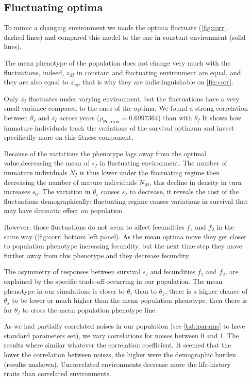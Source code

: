\subsection*{Fluctuating optima}

To mimic a changing environment we made the optima fluctuate (\autoref{fig:corr}, dashed lines) and compared this model to the one in constant environment (solid lines).

The mean phenotype of the population does not change very much with the fluctuations, indeed, $\overline{z_M}$ in constant and fluctuating environment are equal, and they are also equal to $\overline{z_{eq}}$, that is why they are indistinguishable on \autoref{fig:corr}.

Only $\overline{z_I}$ fluctuates under varying environment, but the fluctuations have a very small variance compared to the ones of the optima. We found a strong correlation between $\theta_s$ and $\overline{z_I}$ across years ($\rho_{\text{Pearson}} = 0.6997364$) than with $\theta_f$ It shows how immature individuals track the variations of the survival optimum and invest specifically more on this fitness component.

Because of the variations the phenotype lags away from the optimal value,decreasing the mean of $s_I$ in fluctuating environment. The number of immature individuals $N_I$ is thus lower under the fluctuating regime then decreasing the number of mature individuals $N_M$, this decline in density in turn increases $s_0$. The variation in $\theta_s$ causes $s_I$ to decrease, it reveals the cost of the fluctuations demographically: fluctuating regime causes variations in survival that may have dramatic effect on population.

However, those fluctuations do not seem to affect fecundities $f_1$ and $f_2$ in the same way (\autoref{fig:corr} bottom left panel). As the mean optima move they get closer to population phenotype increasing fecundity, but the next time step they move further away from this phenotype and they decrease fecundity.

The asymmetry of responses between  survival $s_I$ and  fecundities $f_1$ and $f_2$, are explained by the specific trade-off occurring in our population. The mean phenotype in our simulations is closer to $\theta_s$ than to $\theta_f$, there is a higher chance of $\theta_s$ to be lower or much higher than the mean population phenotype, then there is for $\theta_f$ to cross the mean population phenotype line.

As we had partially correlated noises in our population (see \autoref{tab:params} to have standard parameters set), we vary correlations for noises between 0 and 1. The results where similar whatever the correlation coefficient. It seemed that the lower the correlation between noises, the higher were the demographic burden (results unshown). Uncorrelated environments decrease more the life-history traits than correlated environments.

